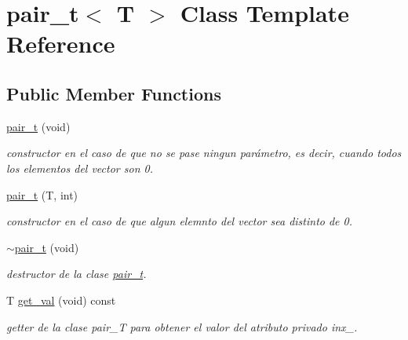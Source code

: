 \hypertarget{classpair__t}{}\section{pair\+\_\+t$<$ T $>$ Class Template Reference}
\label{classpair__t}
\subsection*{Public Member Functions}
\begin{DoxyCompactItemize}
\item 
\mbox{\label{classpair__t_abf9dcbe90e3cb3597484a758f2dff7f4}} 
\hyperlink{classpair__t_abf9dcbe90e3cb3597484a758f2dff7f4}{pair\+\_\+t} (void)
\begin{DoxyCompactList}\small\item\em constructor en el caso de que no se pase ningun parámetro, es decir, cuando todos los elementos del vector son 0. \end{DoxyCompactList}\item 
\mbox{\label{classpair__t_ad4437b0b261d7a4f57fcd75db68ae645}} 
\hyperlink{classpair__t_ad4437b0b261d7a4f57fcd75db68ae645}{pair\+\_\+t} (T, int)
\begin{DoxyCompactList}\small\item\em constructor en el caso de que algun elemnto del vector sea distinto de 0. \end{DoxyCompactList}\item 
\mbox{\label{classpair__t_a6d65d90d867959c2a9aa59c29430a0db}} 
\hyperlink{classpair__t_a6d65d90d867959c2a9aa59c29430a0db}{$\sim$pair\+\_\+t} (void)
\begin{DoxyCompactList}\small\item\em destructor de la clase \hyperlink{classpair__t}{pair\+\_\+t}. \end{DoxyCompactList}\item 
\mbox{\label{classpair__t_a200f61c772d0b4d7a568f8bd46748891}} 
T \hyperlink{classpair__t_a200f61c772d0b4d7a568f8bd46748891}{get\+\_\+val} (void) const
\begin{DoxyCompactList}\small\item\em getter de la clase pair\+\_\+T para obtener el valor del atributo privado inx\+\_\+. \end{DoxyCompactList}\item 

\end{DoxyCompactItemize}
